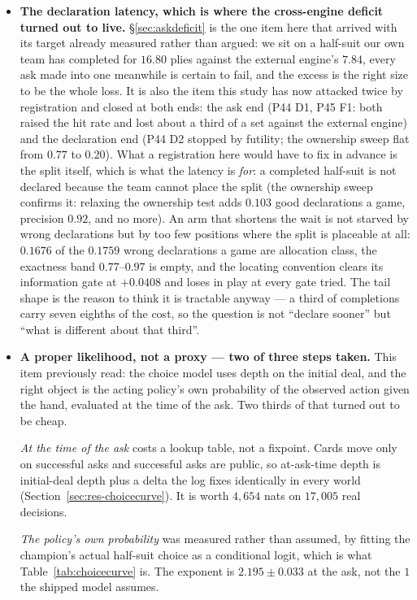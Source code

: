 \documentclass[11pt,letterpaper]{article}
\begin{document}
\begin{itemize}
\item \textbf{The declaration latency, which is where the cross-engine deficit
turned out to live.} \S\ref{sec:askdeficit} is the one item here that arrived
with its target already measured rather than argued: we sit on a half-suit our
own team has completed for $16.80$ plies against the external engine's $7.84$, every ask
made into one meanwhile is certain to fail, and the excess is the right size to
be the whole loss. It is also the item this study has now attacked twice by
registration and closed at both ends: the ask end (P44 D1, P45 F1: both raised
the hit rate and lost about a third of a set against the external engine) and the
declaration end (P44 D2 stopped by futility; the ownership sweep flat from
$0.77$ to $0.20$). What a registration here would have to fix in advance is
the split itself, which is what the latency is \emph{for}: a completed
half-suit is not declared because the team cannot place the split (the
ownership sweep confirms it: relaxing the ownership test adds $0.103$ good
declarations a game, precision $0.92$, and no more). An arm that shortens the
wait is not starved by wrong declarations but by too few positions where the
split is placeable at all: $0.1676$ of the $0.1759$ wrong declarations a game
are allocation class, the exactness band $0.77$--$0.97$ is empty, and the
locating convention clears its information gate at $+0.0408$ and loses in
play at every gate tried. The tail shape is the reason to think it is
tractable anyway --- a third of completions carry seven eighths of the
cost, so the question is not ``declare sooner'' but ``what is different about
that third''.
\item \textbf{A proper likelihood, not a proxy --- two of three steps taken.}
This item previously read: the choice model uses depth on the initial deal, and
the right object is the acting policy's own probability of the observed action
given the hand, evaluated at the time of the ask. Two thirds of that turned out
to be cheap.

\emph{At the time of the ask} costs a lookup table, not a fixpoint. Cards move
only on successful asks and successful asks are public, so at-ask-time depth is
initial-deal depth plus a delta the log fixes identically in every world
(Section~\ref{sec:res-choicecurve}). It is worth $4{,}654$ nats on
$17{,}005$ real decisions.

\emph{The policy's own probability} was measured rather than assumed, by fitting
the champion's actual half-suit choice as a conditional logit, which is what
Table~\ref{tab:choicecurve} is. The exponent is $2.195 \pm 0.033$ at the ask,
not the $1$ the shipped model assumes.


\end{itemize}
\end{document}
